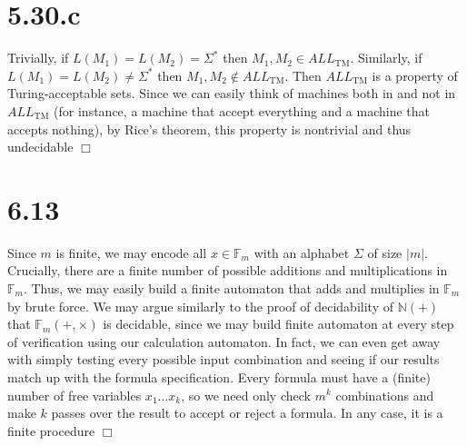 \documentclass{article}
\begin{document}
\section*{5.30.c}
Trivially, if $L(M_1) = L(M_2) = \Sigma^*$ then $M_1,M_2 \in ALL_{\mathrm{TM}}$. Similarly, if $L(M_1) = L(M_2) \neq \Sigma^*$ then $M_1,M_2 \notin ALL_{\mathrm{TM}}$. Then $ALL_{\mathrm{TM}}$ is a property of Turing-acceptable sets. Since we can easily think of machines both in and not in $ALL_{\mathrm{TM}}$ (for instance, a machine that accept everything and a machine that accepts nothing), by Rice's theorem, this property is nontrivial and thus undecidable $\Box$

\section*{6.13}
Since $m$ is finite, we may encode all $x \in \mathbb{F}_m$ with an alphabet $\Sigma$ of size $|m|$. Crucially, there are a finite number of possible additions and multiplications in $\mathbb{F}_m$. Thus, we may easily build a finite automaton that adds and multiplies in $\mathbb{F}_m$ by brute force. We may argue similarly to the proof of decidability of $\mathbb{N}(+)$ that $\mathbb{F}_m(+,\times)$ is decidable, since we may build finite automaton at every step of verification using our calculation automaton. In fact, we can even get away with simply testing every possible input combination and seeing if our results match up with the formula specification. Every formula must have a (finite) number of free variables $x_1 \dots x_k$, so we need only check $m^{k}$ combinations and make $k$ passes over the result to accept or reject a formula. In any case, it is a finite procedure $\Box$
\end{document}

